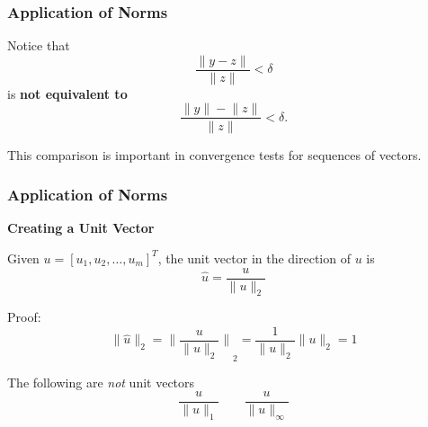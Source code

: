 \documentclass[10pt]{beamer}
\newcommand{\norm}[1]{{\ensuremath{{\|#1\|}}}}
\begin{document}
\begin{frame}
\frametitle{Application of Norms}

Notice that
\begin{equation*}
    \frac{\norm{y-z}}{\norm{z}} < \delta
\end{equation*}
is \textbf{not equivalent to}
\begin{equation*}
    \frac{\norm{y}-\norm{z}}{\norm{z}} < \delta.
\end{equation*}

This comparison is important in convergence tests for sequences
of vectors.  

\end{frame}
\begin{frame}
\frametitle{Application of Norms}

\textbf{Creating a Unit Vector}

Given $u=[u_1, u_2, \ldots, u_m]^T$, the unit vector in the direction of $u$ is
\begin{equation*}
    \hat{u} = \frac{u}{\|u\|_{2}}
\end{equation*}

\bigskip
Proof:
\begin{equation*}
    \|{\hat{u}}\|_{2} = {\biggl\|\frac{u}{\|u\|_{2}}\biggr\|}_2 = \frac{1}{\|u\|_{2}}\|u\|_{2} = 1
\end{equation*}

\bigskip
The following are \emph{not} unit vectors
\begin{equation*}
    \frac{u}{\|u\|_{1}}
    \qquad
    \frac{u}{\|u\|_{\infty}}
\end{equation*}



\end{frame}
\end{document}
